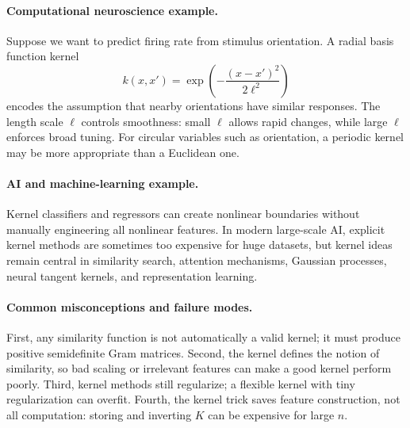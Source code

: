 \paragraph{Computational neuroscience example.}
Suppose we want to predict firing rate from stimulus orientation. A radial basis function kernel
\[
k(x,x')=\exp\left(-\frac{(x-x')^2}{2\ell^2}\right)
\]
encodes the assumption that nearby orientations have similar responses. The length scale \(\ell\) controls smoothness: small \(\ell\) allows rapid changes, while large \(\ell\) enforces broad tuning. For circular variables such as orientation, a periodic kernel may be more appropriate than a Euclidean one.

\paragraph{AI and machine-learning example.}
Kernel classifiers and regressors can create nonlinear boundaries without manually engineering all nonlinear features. In modern large-scale AI, explicit kernel methods are sometimes too expensive for huge datasets, but kernel ideas remain central in similarity search, attention mechanisms, Gaussian processes, neural tangent kernels, and representation learning.

\paragraph{Common misconceptions and failure modes.}
First, any similarity function is not automatically a valid kernel; it must produce positive semidefinite Gram matrices. Second, the kernel defines the notion of similarity, so bad scaling or irrelevant features can make a good kernel perform poorly. Third, kernel methods still regularize; a flexible kernel with tiny regularization can overfit. Fourth, the kernel trick saves feature construction, not all computation: storing and inverting \(K\) can be expensive for large \(n\).

